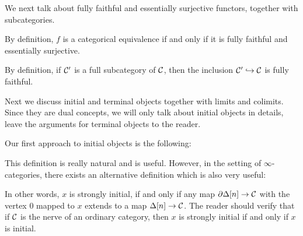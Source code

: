 We next talk about fully faithful and essentially surjective functors, together with subcategories.


By definition, $f$ is a categorical equivalence if and only if it is fully faithful and essentially surjective.


By definition, if $\mathcal{C}'$ is a full subcategory of $\mathcal{C}$, then the inclusion $\mathcal{C}'\hookrightarrow\mathcal{C}$ is fully faithful.

Next we discuss initial and terminal objects together with limits and colimits. Since they are dual concepts, we will only talk about
initial objects in details, leave the arguments for terminal objects to the reader.

Our first approach to initial objects is the following:


This definition is really natural and is useful. However, in the setting of $\infty$-categories, there exists an alternative definition
which is also very useful:


In other words, $x$ is strongly initial, if and only if any map $\partial\Delta[n]\to\mathcal{C}$ with the vertex $0$ mapped to $x$ extends to a map
$\Delta[n]\to\mathcal{C}$. The reader should verify that if $\mathcal{C}$ is the nerve of an ordinary category, then $x$ is strongly initial
if and only if $x$ is initial.

